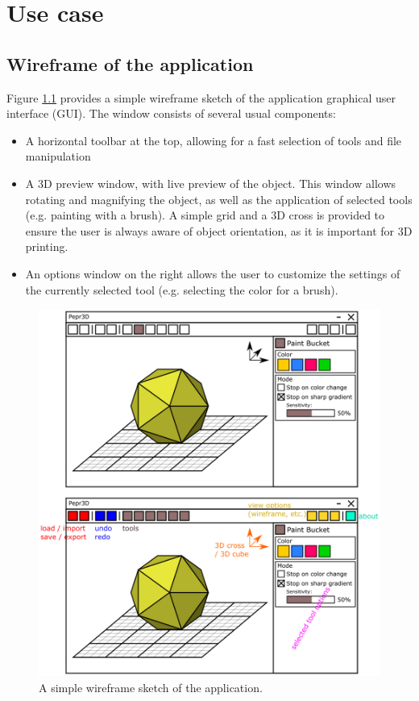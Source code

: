 \chapter{Use case}

\section{Wireframe of the application}

Figure \ref{fig:wireframe} provides a simple wireframe sketch of the application graphical user interface (GUI). The window consists of several usual components:
\begin{itemize}
\item A horizontal toolbar at the top, allowing for a fast selection of tools and file manipulation
\item A 3D preview window, with live preview of the object. This window allows rotating and magnifying the object, as well as the application of selected tools (e.g. painting with a brush). A simple grid and a 3D cross is provided to ensure the user is always aware of object orientation, as it is important for 3D printing.
\item An options window on the right allows the user to customize the settings of the currently selected tool (e.g. selecting the color for a brush).
\end{itemize}

\hspace{-30pt}
\begin{figure}
	\centering
	\includegraphics[scale=0.35]{images/wireframe.png}
	\caption{A simple wireframe sketch of the application.}
	\label{fig:wireframe}
\end{figure}

